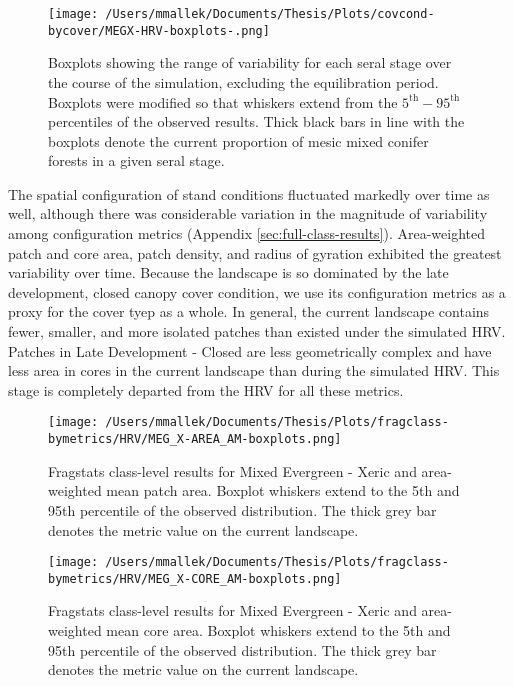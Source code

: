 \begin{figure}[!htbp]
  \centering
    \texttt{[image: /Users/mmallek/Documents/Thesis/Plots/covcond-bycover/MEGX-HRV-boxplots-.png]}
  \caption{Boxplots showing the range of variability for each seral stage over the course of the simulation, excluding the equilibration period. Boxplots were modified so that whiskers extend from the $5^{\text{th}} - 95^{\text{th}}$ percentiles of the observed results. Thick black bars in line with the boxplots denote the current proportion of mesic mixed conifer forests in a given seral stage.} 
  \label{fig:covcond_megx_boxplots}
\end{figure}

The spatial configuration of stand conditions fluctuated markedly over time as well, although there was considerable variation in the magnitude of variability among configuration metrics (Appendix \ref{sec:full-class-results}). Area-weighted patch and core area, patch density, and radius of gyration exhibited the greatest variability over time. Because the landscape is so dominated by the late development, closed canopy cover condition, we use its configuration metrics as a proxy for the cover tyep as a whole. In general, the current landscape contains fewer, smaller, and more isolated patches than existed under the simulated HRV. Patches in Late Development - Closed are less geometrically complex and have less area in cores in the current landscape than during the simulated HRV. This stage is completely departed from the HRV for all these metrics.

\begin{figure}[!htbp]
\centering
    \texttt{[image: /Users/mmallek/Documents/Thesis/Plots/fragclass-bymetrics/HRV/MEG\_X-AREA\_AM-boxplots.png]}
  \caption{Fragstats class-level results for Mixed Evergreen - Xeric and area-weighted mean patch area. Boxplot whiskers extend to the 5th and 95th percentile of the observed distribution. The thick grey bar denotes the metric value on the current landscape.}
  \label{fig:megx_areaam}
\end{figure}


\begin{figure}[!htbp]
\centering
    \texttt{[image: /Users/mmallek/Documents/Thesis/Plots/fragclass-bymetrics/HRV/MEG\_X-CORE\_AM-boxplots.png]}
  \caption{Fragstats class-level results for Mixed Evergreen - Xeric and area-weighted mean core area. Boxplot whiskers extend to the 5th and 95th percentile of the observed distribution. The thick grey bar denotes the metric value on the current landscape.}
  \label{fig:megx_coream}
\end{figure}


